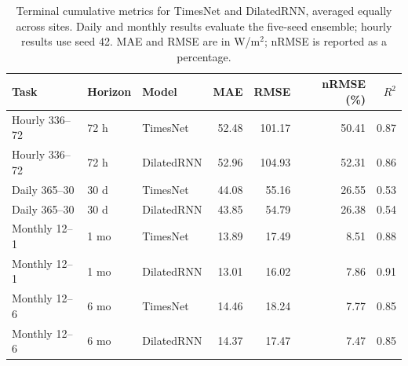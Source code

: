 \begin{table}[htbp]
\centering
\caption{Terminal cumulative metrics for TimesNet and DilatedRNN, averaged equally across sites. Daily and monthly results evaluate the five-seed ensemble; hourly results use seed 42. MAE and RMSE are in W/m$^2$; nRMSE is reported as a percentage.}
\label{tab:metricas-terminais}
\small
\setlength{\tabcolsep}{5pt}
\begin{tabular}{ll l rrrr}
\toprule
Task & Horizon & Model & MAE & RMSE & nRMSE (\%) & $R^2$ \\
\midrule
Hourly 336--72 & 72 h & TimesNet & 52.48 & 101.17 & 50.41 & 0.87 \\
Hourly 336--72 & 72 h & DilatedRNN & 52.96 & 104.93 & 52.31 & 0.86 \\
\addlinespace
Daily 365--30 & 30 d & TimesNet & 44.08 & 55.16 & 26.55 & 0.53 \\
Daily 365--30 & 30 d & DilatedRNN & 43.85 & 54.79 & 26.38 & 0.54 \\
\addlinespace
Monthly 12--1 & 1 mo & TimesNet & 13.89 & 17.49 & 8.51 & 0.88 \\
Monthly 12--1 & 1 mo & DilatedRNN & 13.01 & 16.02 & 7.86 & 0.91 \\
\addlinespace
Monthly 12--6 & 6 mo & TimesNet & 14.46 & 18.24 & 7.77 & 0.85 \\
Monthly 12--6 & 6 mo & DilatedRNN & 14.37 & 17.47 & 7.47 & 0.85 \\
\bottomrule
\end{tabular}
\end{table}
